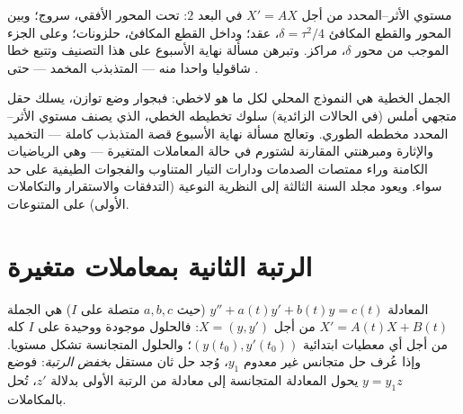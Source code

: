\begin{omfigure}

{\small مستوي الأثر--المحدد من أجل $X' = AX$ في البعد $2$: تحت
المحور الأفقي، سروج؛ وبين المحور والقطع المكافئ $\delta = \tau^2/4$، عقد؛ وداخل
القطع المكافئ، حلزونات؛ وعلى الجزء الموجب من محور $\delta$، مراكز.
وتبرهن مسألة نهاية الأسبوع على هذا التصنيف وتتبع خطا شاقوليا واحدا
منه --- المتذبذب المخمد --- حتى .}
\end{omfigure}

\begin{remark}
الجمل الخطية هي النموذج المحلي لكل ما هو لاخطي: فبجوار وضع توازن،
يسلك حقل متجهي أملس (في الحالات الزائدية) سلوك تخطيطه الخطي، الذي
يصنف مستوي الأثر--المحدد مخططه الطوري. وتعالج مسألة نهاية الأسبوع
قصة المتذبذب كاملة --- التخميد والإثارة  ومبرهنتي المقارنة
لشتورم في حالة المعاملات المتغيرة --- وهي الرياضيات الكامنة وراء
ممتصات الصدمات ودارات التيار المتناوب والفجوات الطيفية على حد سواء.
ويعود مجلد السنة الثالثة إلى النظرية النوعية (التدفقات والاستقرار
والتكاملات الأولى) على المتنوعات.
\end{remark}

\section{الرتبة الثانية بمعاملات متغيرة}

\begin{proposition}\label{prop:b2:diffeq:secondorder}
المعادلة $y'' + a(t)y' + b(t)y = c(t)$ (حيث $a, b, c$ متصلة على $I$) هي الجملة $X' = A(t)X + B(t)$ من
أجل $X = (y, y')$: فالحلول موجودة ووحيدة على $I$ كله من أجل أي معطيات
ابتدائية $(y(t_0),
y'(t_0))$؛ والحلول المتجانسة تشكل مستويا. وإذا عُرف حل متجانس
غير معدوم $y_1$، وُجد حل ثان مستقل \emph{بخفض الرتبة}: فوضع $y = y_1 z$
يحول المعادلة المتجانسة إلى معادلة من الرتبة الأولى بدلالة $z'$،
تُحل بالمكاملات.
\end{proposition}

